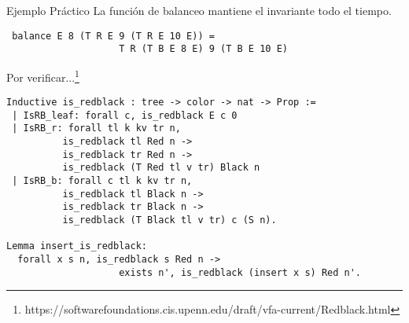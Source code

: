 \documentclass[xcolor=dvipsnames,table,handout]{beamer}
\begin{document}
\begin{frame}[fragile]{Ejemplo Práctico}
La función de balanceo mantiene el invariante todo el tiempo.

\centering
\begin{lstlisting}
 balance E 8 (T R E 9 (T R E 10 E)) =
                    T R (T B E 8 E) 9 (T B E 10 E)
\end{lstlisting}

\end{frame}


\begin{frame}[fragile]{Por verificar...\footnote[frame]{https://softwarefoundations.cis.upenn.edu/draft/vfa-current/Redblack.html}}
    \begin{lstlisting}[language=coq]
Inductive is_redblack : tree -> color -> nat -> Prop :=
 | IsRB_leaf: forall c, is_redblack E c 0
 | IsRB_r: forall tl k kv tr n,
          is_redblack tl Red n ->
          is_redblack tr Red n ->
          is_redblack (T Red tl v tr) Black n
 | IsRB_b: forall c tl k kv tr n,
          is_redblack tl Black n ->
          is_redblack tr Black n ->
          is_redblack (T Black tl v tr) c (S n).

Lemma insert_is_redblack:
  forall x s n, is_redblack s Red n ->
                    exists n', is_redblack (insert x s) Red n'.
    \end{lstlisting}
    
\end{frame}
\end{document}
